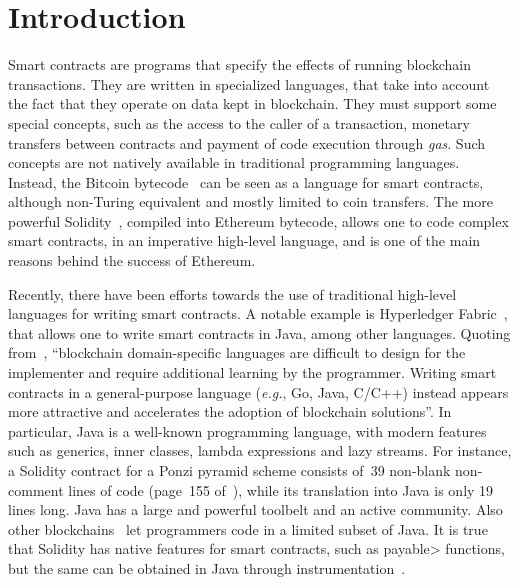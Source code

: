 \section{Introduction}\label{sec:introduction}

Smart contracts are programs that specify the effects of running blockchain transactions.
They are written in specialized languages, that take into account
the fact that they operate on data kept in blockchain. They must
support some special concepts, such as the access to the caller of a transaction,
monetary transfers between contracts
and payment of code execution through \emph{gas}.
Such concepts are not natively available
in traditional programming languages.
Instead, the Bitcoin bytecode~\cite{Antonopoulos17,Nakamoto08}
can be seen as a language for smart contracts,
although non-Turing equivalent and mostly limited to coin transfers. The more
powerful Solidity~\cite{AntonopoulosW18},
compiled into Ethereum bytecode, allows one to code
complex smart contracts, in an imperative high-level language, and is
one of the main reasons behind the success of Ethereum.

Recently, there have been efforts towards the use of traditional
high-level languages for writing smart contracts.
A notable example is Hyperledger Fabric~\cite{AndroulakiBBCCC18,Vukolic17}, that allows one
to write smart contracts in Java, among other languages. Quoting from~\cite{AndroulakiBBCCC18},
``blockchain domain-specific languages are difficult to design for the implementer
and require additional learning by the programmer. Writing smart contracts
in a general-purpose language (\emph{e.g.}, Go, Java, C/C++) instead
appears more attractive and accelerates the adoption of blockchain solutions''.
In particular, Java is a well-known programming language,
with modern features such as generics, inner classes, lambda
expressions and lazy streams. For instance, a Solidity contract
for a Ponzi pyramid scheme consists of~39 non-blank non-comment lines of code
(page~155 of~\cite{IyerD18}), while its translation into Java is only 19 lines
long. %
Java has a large and powerful toolbelt and an active community.
Also other blockchains~\cite{aion,aion_example_contract,neo,neo_contract,Spoto19}
let programmers code in a limited subset of Java.
It is true that Solidity has native features for smart contracts, such as
\<payable> functions, but the same can be obtained in Java through instrumentation~\cite{Spoto19}.

